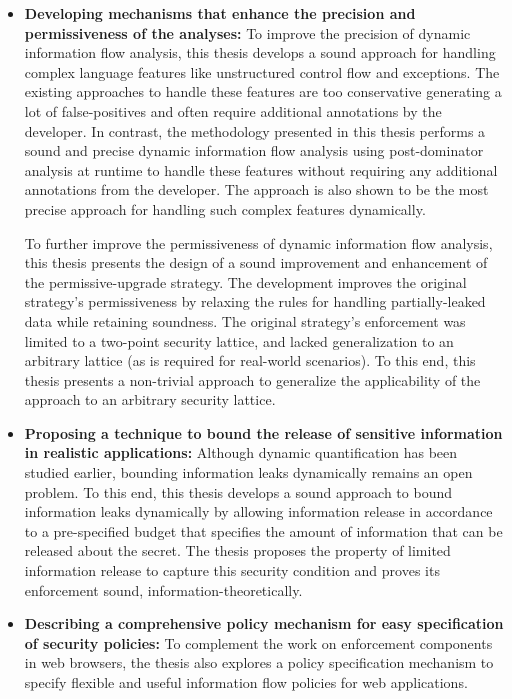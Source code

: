 \begin{itemize}
\item \textbf{Developing mechanisms that enhance the precision and 
  permissiveness of the analyses:} To improve the precision of dynamic
information flow analysis, this thesis develops a sound approach for  
handling complex language features like unstructured control flow and
exceptions. The existing approaches to handle these features are too
conservative generating a lot of false-positives and often require
additional annotations by the developer. In contrast, the methodology
presented in this thesis performs a sound and precise dynamic
information flow analysis using post-dominator analysis at runtime to
handle these features without requiring any additional annotations
from the developer. The approach is also shown to be the most precise 
approach for handling such complex features dynamically. 

To further improve the permissiveness of dynamic information flow
analysis, this thesis presents the design of a sound improvement and
enhancement of the permissive-upgrade strategy. The development
improves the original strategy's permissiveness by relaxing the rules
for handling partially-leaked data while retaining soundness. The
original strategy's enforcement was limited to a two-point security
lattice, and lacked generalization to an arbitrary lattice (as is
required for real-world scenarios). To this end, this thesis presents
a non-trivial approach to generalize the applicability of the approach
to an arbitrary security lattice.  

\item \textbf{Proposing a technique to bound the release of sensitive
  information in realistic applications:} Although dynamic
quantification has been studied earlier, bounding information leaks
dynamically remains an open problem. To this end, this thesis 
develops a sound approach to bound information leaks dynamically by 
allowing information release in accordance to a pre-specified budget
that specifies the amount of information that can be released about
the secret. The thesis proposes the property of limited information
release to capture this security condition and proves its enforcement
sound, information-theoretically. 

\item \textbf{Describing a comprehensive policy mechanism for easy
  specification of security policies:} To complement the work on
enforcement components in web browsers, the thesis also  explores a
policy specification mechanism to specify flexible and useful
information flow policies for web applications. 
\end{itemize}

